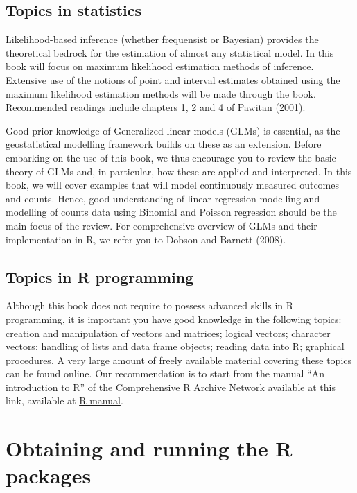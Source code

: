 \documentclass[
  letterpaper,
]{krantz}
\begin{document}
\hypertarget{topics-in-statistics}{%
\subsection{Topics in statistics}\label{topics-in-statistics}}

Likelihood-based inference (whether frequensist or Bayesian) provides
the theoretical bedrock for the estimation of almost any statistical
model. In this book will focus on maximum likelihood estimation methods
of inference. Extensive use of the notions of point and interval
estimates obtained using the maximum likelihood estimation methods will
be made through the book. Recommended readings include chapters 1, 2 and
4 of Pawitan (2001).

Good prior knowledge of Generalized linear models (GLMs) is essential,
as the geostatistical modelling framework builds on these as an
extension. Before embarking on the use of this book, we thus encourage
you to review the basic theory of GLMs and, in particular, how these are
applied and interpreted. In this book, we will cover examples that will
model continuously measured outcomes and counts. Hence, good
understanding of linear regression modelling and modelling of counts
data using Binomial and Poisson regression should be the main focus of
the review. For comprehensive overview of GLMs and their implementation
in R, we refer you to Dobson and Barnett (2008).

\hypertarget{topics-in-r-programming}{%
\subsection{Topics in R programming}\label{topics-in-r-programming}}

Although this book does not require to possess advanced skills in R
programming, it is important you have good knowledge in the following
topics: creation and manipulation of vectors and matrices; logical
vectors; character vectors; handling of lists and data frame objects;
reading data into R; graphical procedures. A very large amount of freely
available material covering these topics can be found online. Our
recommendation is to start from the manual ``An introduction to R'' of
the Comprehensive R Archive Network available at this link, available at
\href{https://cran.r-project.org/manuals.html}{R manual}.

\hypertarget{obtaining-and-running-the-r-packages}{%
\section{Obtaining and running the R
packages}\label{obtaining-and-running-the-r-packages}}
\end{document}
